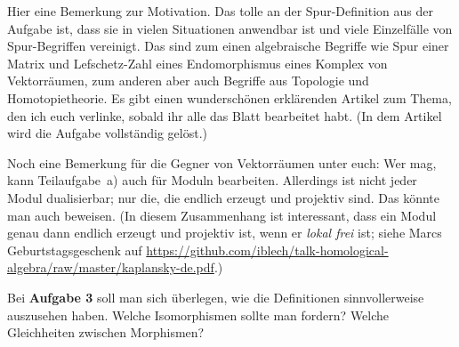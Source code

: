\documentclass{uebblatt}
\begin{document}
Hier eine Bemerkung zur Motivation. Das tolle an der Spur-Definition aus der
Aufgabe ist, dass sie in vielen Situationen anwendbar ist und viele Einzelfälle
von Spur-Begriffen vereinigt. Das sind zum einen algebraische Begriffe wie Spur
einer Matrix und Lefschetz-Zahl eines Endomorphismus eines Komplex von
Vektorräumen, zum anderen aber auch Begriffe aus Topologie und
Homotopietheorie. Es gibt einen wunderschönen erklärenden Artikel zum Thema,
den ich euch verlinke, sobald ihr alle das Blatt bearbeitet habt. (In dem
Artikel wird die Aufgabe vollständig gelöst.)

Noch eine Bemerkung für die Gegner von Vektorräumen unter euch: Wer mag, kann
Teilaufgabe~a) auch für Moduln bearbeiten. Allerdings ist nicht jeder Modul
dualisierbar; nur die, die endlich erzeugt und projektiv sind. Das könnte man
auch beweisen. (In diesem Zusammenhang ist interessant, dass ein Modul genau
dann endlich erzeugt und projektiv ist, wenn er \emph{lokal frei} ist;
siehe Marcs Geburtstagsgeschenk auf
\url{https://github.com/iblech/talk-homological-algebra/raw/master/kaplansky-de.pdf}.)

Bei \textbf{Aufgabe 3} soll man sich überlegen, wie die Definitionen
sinnvollerweise auszusehen haben. Welche Isomorphismen sollte man fordern?
Welche Gleichheiten zwischen Morphismen?
\end{document}
